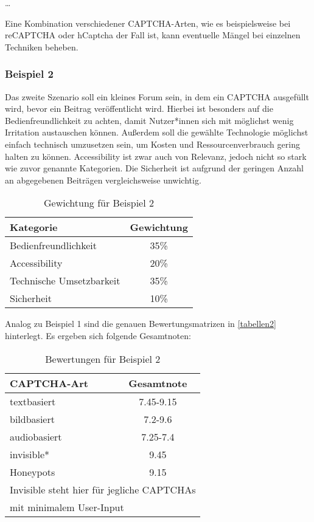 \dots

Eine Kombination verschiedener CAPTCHA-Arten, wie es beispielsweise bei reCAPTCHA oder hCaptcha der Fall ist, 
kann eventuelle Mängel bei einzelnen Techniken beheben.

\subsubsection*{Beispiel 2}
Das zweite Szenario soll ein kleines Forum sein, in dem ein CAPTCHA ausgefüllt wird, bevor ein Beitrag veröffentlicht wird.
Hierbei ist besonders auf die Bedienfreundlichkeit zu achten, damit Nutzer*innen sich mit möglichst wenig Irritation austauschen können.
Außerdem soll die gewählte Technologie möglichst einfach technisch umzusetzen sein, um Kosten und Ressourcenverbrauch gering halten zu können.
Accessibility ist zwar auch von Relevanz, jedoch nicht so stark wie zuvor genannte Kategorien.
Die Sicherheit ist aufgrund der geringen Anzahl an abgegebenen Beiträgen vergleichsweise unwichtig.

\begin{table}[h!]
    \caption{Gewichtung für Beispiel 2}
    \begin{center}
        \begin{tabular}{l|c}
            Kategorie                       & Gewichtung \\\hline
            Bedienfreundlichkeit            & 35\%         \\
            Accessibility                   & 20\%        \\
            Technische Umsetzbarkeit        & 35\%         \\
            Sicherheit                      & 10\%         
        \end{tabular}
    \end{center}
\end{table}

Analog zu Beispiel 1 sind die genauen Bewertungsmatrizen in \autoref{tabellen2} hinterlegt.
Es ergeben sich folgende Gesamtnoten:

\begin{table}[h!]
    \caption{Bewertungen für Beispiel 2}
    \begin{center}
        \begin{tabular}{l|c}
            CAPTCHA-Art                       & Gesamtnote \\\hline
            textbasiert            & 7.45-9.15        \\
            bildbasiert                   & 7.2-9.6       \\
            audiobasiert        & 7.25-7.4         \\
            invisible*                      & 9.45         \\
            Honeypots & 9.15 \\
           \multicolumn{2}{l}{\footnotesize * Invisible steht hier für jegliche CAPTCHAs} \\
           \multicolumn{2}{l}{\footnotesize   \enspace mit minimalem User-Input}
        \end{tabular}
    \end{center}
\end{table}